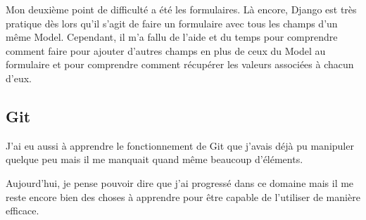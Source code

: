 \documentclass[a4paper]{report}
\begin{document}
\par Mon deuxième point de difficulté a été les formulaires. Là encore, Django est très pratique dès lors qu’il s’agit de faire un formulaire avec tous les champs d’un même Model. Cependant, il m’a fallu de l’aide et du temps pour comprendre comment faire pour ajouter d’autres champs en plus de ceux du Model au formulaire et pour comprendre comment récupérer les valeurs associées à chacun d’eux.

\subsection{Git}
\par J’ai eu aussi à apprendre le fonctionnement de Git que j’avais déjà pu manipuler quelque peu mais il me manquait quand même beaucoup d’éléments. 

\par Aujourd’hui, je pense pouvoir dire que j’ai progressé dans ce domaine mais il me reste encore bien des choses à apprendre pour être capable de l’utiliser de manière efficace.
\end{document}
